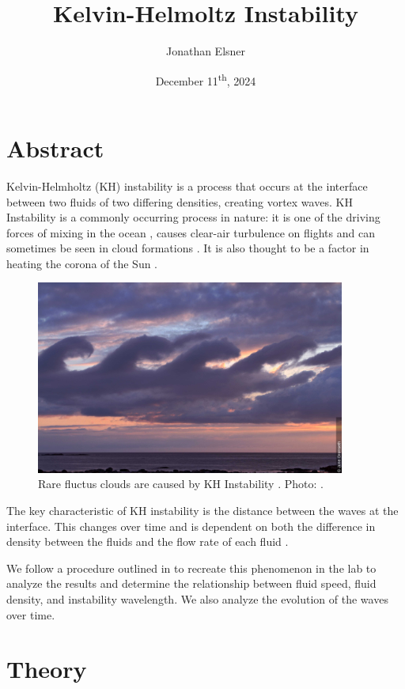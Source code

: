 \documentclass{article}
\title{Kelvin-Helmoltz Instability}
\author{Jonathan Elsner}
\date{December 11\textsuperscript{th}, 2024}
\begin{document}
\maketitle

\section{Abstract}

Kelvin-Helmholtz (KH) instability is a process that occurs at the interface
between two fluids of two differing densities, creating vortex waves. KH
Instability is a commonly occurring process in nature: it is one of the driving
forces of mixing in the ocean \cite{woods-1968}, causes clear-air turbulence on
flights and can sometimes be seen in cloud formations \cite{ludlam-1967}. It is
also thought to be a factor in heating the corona of the Sun
\cite{nasa-solar-surfer}.

\begin{figure}[h]
    \centering
    \includegraphics[width=4in]{kh-instability-clouds-2.jpg}
    \caption{Rare fluctus clouds are caused by KH Instability \cite{ludlam-1967}. Photo: \cite{fluctus-clouds}.}
    \label{img:fluctus-clouds}
\end{figure}

The key characteristic of KH instability is the distance between the waves at
the interface. This changes over time and is dependent on both the difference in
density between the fluids and the flow rate of each fluid \cite{kundu}.

We follow a procedure outlined in \cite{kh-instability-demo} to recreate this
phenomenon in the lab to analyze the results and determine the relationship
between fluid speed, fluid density, and instability wavelength. We also analyze
the evolution of the waves over time.


\section{Theory}
\end{document}
